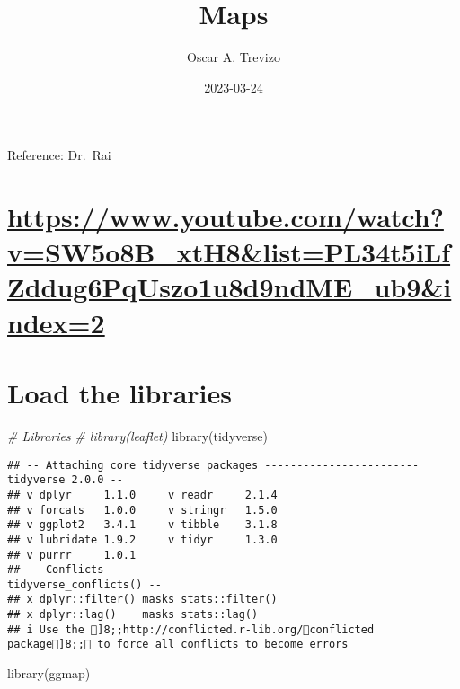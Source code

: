 \documentclass[
]{article}
\title{Maps}
\author{Oscar A. Trevizo}
\date{2023-03-24}
\newenvironment{Shaded}{\begin{snugshade}}{\end{snugshade}}
\newcommand{\CommentTok}[1]{\textcolor[rgb]{0.56,0.35,0.01}{\textit{#1}}}
\newcommand{\FunctionTok}[1]{\textcolor[rgb]{0.00,0.00,0.00}{#1}}
\newcommand{\NormalTok}[1]{#1}
\begin{document}
\maketitle

{
\setcounter{tocdepth}{2}
\tableofcontents
}
Reference: Dr.~Rai

\hypertarget{httpswww.youtube.comwatchvsw5o8b_xth8listpl34t5ilfzddug6pquszo1u8d9ndme_ub9index2}{%
\section{\texorpdfstring{\url{https://www.youtube.com/watch?v=SW5o8B_xtH8\&list=PL34t5iLfZddug6PqUszo1u8d9ndME_ub9\&index=2}}{https://www.youtube.com/watch?v=SW5o8B\_xtH8\&list=PL34t5iLfZddug6PqUszo1u8d9ndME\_ub9\&index=2}}\label{httpswww.youtube.comwatchvsw5o8b_xth8listpl34t5ilfzddug6pquszo1u8d9ndme_ub9index2}}

\hypertarget{load-the-libraries}{%
\section{Load the libraries}\label{load-the-libraries}}

\begin{Shaded}
\begin{Highlighting}[]
\CommentTok{\# Libraries}
\CommentTok{\# library(leaflet)}
\FunctionTok{library}\NormalTok{(tidyverse)}
\end{Highlighting}
\end{Shaded}

\begin{verbatim}
## -- Attaching core tidyverse packages ------------------------ tidyverse 2.0.0 --
## v dplyr     1.1.0     v readr     2.1.4
## v forcats   1.0.0     v stringr   1.5.0
## v ggplot2   3.4.1     v tibble    3.1.8
## v lubridate 1.9.2     v tidyr     1.3.0
## v purrr     1.0.1     
## -- Conflicts ------------------------------------------ tidyverse_conflicts() --
## x dplyr::filter() masks stats::filter()
## x dplyr::lag()    masks stats::lag()
## i Use the ]8;;http://conflicted.r-lib.org/conflicted package]8;; to force all conflicts to become errors
\end{verbatim}

\begin{Shaded}
\begin{Highlighting}[]
\FunctionTok{library}\NormalTok{(ggmap)}
\end{Highlighting}
\end{Shaded}
\end{document}
